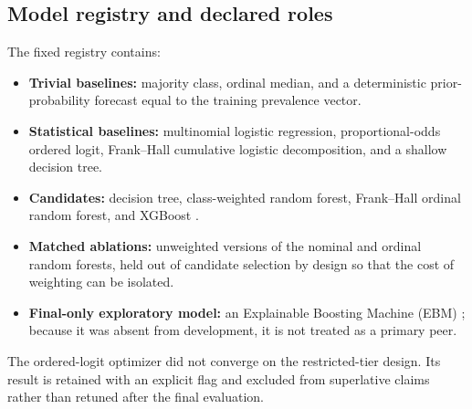 \documentclass[11pt,letterpaper]{article}
\begin{document}
\subsection{Model registry and declared roles}
The fixed registry contains:
\begin{itemize}
  \item \textbf{Trivial baselines:} majority class, ordinal median, and a deterministic prior-probability forecast equal to the training prevalence vector.
  \item \textbf{Statistical baselines:} multinomial logistic regression, proportional-odds ordered logit, Frank--Hall cumulative logistic decomposition, and a shallow decision tree.
  \item \textbf{Candidates:} decision tree, class-weighted random forest, Frank--Hall ordinal random forest, and XGBoost \citep{breiman2001,frankhall2001,chen2016}.
  \item \textbf{Matched ablations:} unweighted versions of the nominal and ordinal random forests, held out of candidate selection by design so that the cost of weighting can be isolated.
  \item \textbf{Final-only exploratory model:} an Explainable Boosting Machine (EBM) \citep{nori2019}; because it was absent from development, it is not treated as a primary peer.
\end{itemize}
The ordered-logit optimizer did not converge on the restricted-tier design. Its result is retained with an explicit flag and excluded from superlative claims rather than retuned after the final evaluation.
\end{document}
